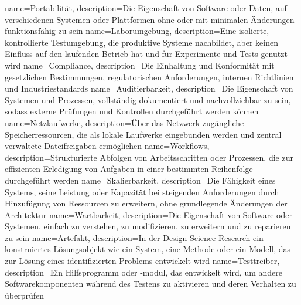{
	name={Por\-ta\-bi\-li\-tät},
	description={Die Ei\-gen\-schaft von Soft\-ware oder Da\-ten, auf ver\-schie\-de\-nen Sys\-te\-men oder Platt\-for\-men ohne oder mit mi\-ni\-ma\-len Än\-de\-run\-gen funk\-ti\-ons\-fä\-hig zu sein}
}
{
	name={La\-bor\-um\-ge\-bung},
	description={Eine iso\-lier\-te, kon\-trol\-lier\-te Test\-um\-ge\-bung, die pro\-duk\-ti\-ve Sys\-te\-me nach\-bil\-det, aber kei\-nen Ein\-fluss auf den lau\-fen\-den Be\-trieb hat und für Ex\-pe\-ri\-men\-te und Tests ge\-nutzt wird}
}
{
	name={Com\-pli\-ance},
	description={Die Ein\-hal\-tung und Kon\-for\-mi\-tät mit ge\-setz\-li\-chen Be\-stim\-mun\-gen, re\-gu\-la\-to\-ri\-schen An\-for\-de\-run\-gen, in\-ter\-nen Richt\-li\-ni\-en und In\-dus\-trie\-stan\-dards}
}
{
	name={Au\-di\-tier\-bar\-keit},
	description={Die Ei\-gen\-schaft von Sys\-te\-men und Pro\-zes\-sen, voll\-stän\-dig do\-ku\-men\-tiert und nach\-voll\-zieh\-bar zu sein, so\-dass ex\-ter\-ne Prü\-fun\-gen und Kon\-trol\-len durch\-ge\-führt wer\-den kön\-nen}
}
{
	name={Netz\-lauf\-wer\-ke},
	description={Über das Netz\-werk zu\-gäng\-li\-che Spei\-cher\-res\-sour\-cen, die als lo\-ka\-le Lauf\-wer\-ke ein\-ge\-bun\-den wer\-den und zen\-tral ver\-wal\-te\-te Da\-tei\-frei\-ga\-ben er\-mög\-li\-chen}
}
{
	name={Work\-flows},
	description={Struk\-tu\-rier\-te Ab\-fol\-gen von Ar\-beits\-schrit\-ten oder Pro\-zes\-sen, die zur ef\-fi\-zi\-en\-ten Er\-le\-di\-gung von Auf\-ga\-ben in ei\-ner be\-stimm\-ten Rei\-hen\-fol\-ge durch\-ge\-führt wer\-den}
}
{
	name={Ska\-lier\-bar\-keit},
	description={Die Fä\-hig\-keit ei\-nes Sys\-tems, sei\-ne Leis\-tung oder Ka\-pa\-zi\-tät bei stei\-gen\-den An\-for\-de\-run\-gen durch Hin\-zu\-fü\-gung von Res\-sour\-cen zu er\-wei\-tern, ohne grund\-le\-gen\-de Än\-de\-run\-gen der Ar\-chi\-tek\-tur}
}
{
	name={Wart\-bar\-keit},
	description={Die Ei\-gen\-schaft von Soft\-ware oder Sys\-te\-men, ein\-fach zu ver\-ste\-hen, zu mo\-di\-fi\-zie\-ren, zu er\-wei\-tern und zu re\-pa\-rie\-ren zu sein}
}
{
	name={Ar\-te\-fakt},
	description={In der De\-sign Sci\-ence Re\-search ein kon\-stru\-ier\-tes Lö\-sungs\-ob\-jekt wie ein Sys\-tem, eine Me\-tho\-de oder ein Mo\-dell, das zur Lö\-sung ei\-nes iden\-ti\-fi\-zier\-ten Pro\-blems ent\-wi\-ckelt wird}
}
{
	name={Test\-trei\-ber},
	description={Ein Hilfs\-pro\-gramm oder -mo\-dul, das ent\-wi\-ckelt wird, um an\-de\-re Soft\-ware\-kom\-po\-nen\-ten wäh\-rend des Tes\-tens zu ak\-ti\-vie\-ren und de\-ren Ver\-hal\-ten zu über\-prü\-fen}
}
